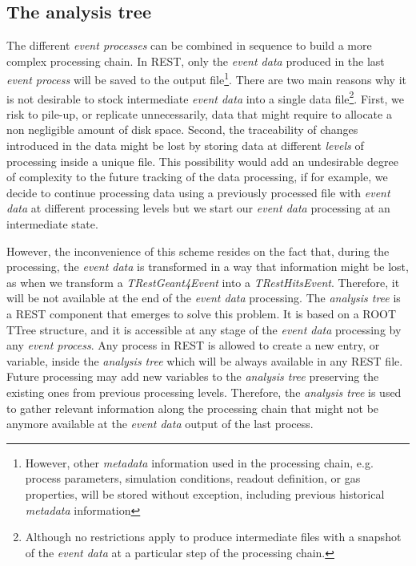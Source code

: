 \subsection{The analysis tree}\label{sc:anTree}

The different \emph{event processes} can be combined in sequence to build a more complex processing chain. In REST, only the \emph{event data} produced in the last \emph{event process} will be saved to the output file\footnote{However, other \emph{metadata} information used in the processing chain, e.g. process parameters, simulation conditions, readout definition, or gas properties, will be stored without exception, including previous historical \emph{metadata} information}. There are two main reasons why it is not desirable to stock intermediate \emph{event data} into a single data file\footnote{Although no restrictions apply to produce intermediate files with a snapshot of the \emph{event data} at a particular step of the processing chain.}. First, we risk to pile-up, or replicate unnecessarily, data that might require to allocate a non negligible amount of disk space. Second, the traceability of changes introduced in the data might be lost by storing data at different \emph{levels} of processing inside a unique file. This possibility would add an undesirable degree of complexity to the future tracking of the data processing, if for example, we decide to continue processing data using a previously processed file with \emph{event data} at different processing levels but we start our \emph{event data} processing at an intermediate state.


However, the inconvenience of this scheme resides on the fact that, during the processing, the \emph{event data} is transformed in a way that information might be lost, as when we transform a \emph{TRestGeant4Event} into a \emph{TRestHitsEvent}. Therefore, it will be not available at the end of the \emph{event data} processing. The \emph{analysis tree} is a REST component that emerges to solve this problem. It is based on a ROOT TTree structure, and it is accessible at any stage of the \emph{event data} processing by any \emph{event process}. Any process in REST is allowed to create a new entry, or variable, inside the \emph{analysis tree} which will be always available in any REST file. Future processing may add new variables to the \emph{analysis tree} preserving the existing ones from previous processing levels. Therefore, the \emph{analysis tree} is used to gather relevant information along the processing chain that might not be anymore available at the \emph{event data} output of the last process.

